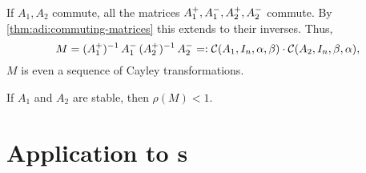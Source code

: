 If $A_1, A_2$ commute,
all the matrices $\mathop{A_1^+},\mathop{A_1^-},\mathop{A_2^+},\mathop{A_2^-}$ commute.
By \autoref{thm:adi:commuting-matrices} this extends to their inverses.
Thus,
\begin{equation*}
  M =
  \mathop{(\mathop{A_1^+})^{-1}}\mathop{A_1^-}
  \mathop{(\mathop{A_2^+})^{-1}}\mathop{A_2^-}
  =:
  \mathcal{C}(A_1, I_n, \alpha, \beta)
  \cdot
  \mathcal{C}(A_2, I_n, \beta, \alpha)
  ,
\end{equation*}
\ie $M$ is even a sequence of Cayley transformations.

\begin{hypothesis}
\label{thm:adi:convergence}
  If $A_1$ and $A_2$ are stable, then $\rho(M) < 1$.
\end{hypothesis}

\section{Application to s}
\label{sec:adi:ale}

